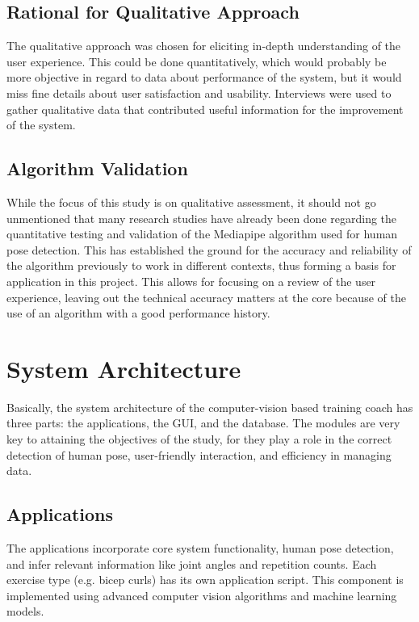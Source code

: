     \subsection{Rational for Qualitative Approach}
        The qualitative approach was chosen for eliciting in-depth understanding of the user experience. This could be done quantitatively, which would probably be more objective in regard to data about performance of the system, but it would miss fine details about user satisfaction and usability. Interviews were used to gather qualitative data that contributed useful information for the improvement of the system.
    \subsection{Algorithm Validation}
        While the focus of this study is on qualitative assessment, it should not go unmentioned that many research studies have already been done regarding the quantitative testing and validation of the Mediapipe algorithm used for human pose detection. This has established the ground for the accuracy and reliability of the algorithm previously to work in different contexts, thus forming a basis for application in this project. This allows for focusing on a review of the user experience, leaving out the technical accuracy matters at the core because of the use of an algorithm with a good performance history.
\section{System Architecture}
    Basically, the system architecture of the computer-vision based training coach has three parts: the applications, the GUI, and the database. The modules are very key to attaining the objectives of the study, for they play a role in the correct detection of human pose, user-friendly interaction, and efficiency in managing data.
    \subsection{Applications}
        The applications incorporate core system functionality, human pose detection, and infer relevant information like joint angles and repetition counts. Each exercise type (e.g. bicep curls) has its own application script. This component is implemented using advanced computer vision algorithms and machine learning models.
